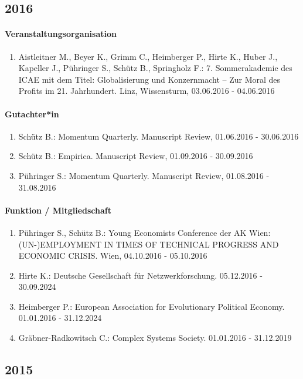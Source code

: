 \subsection*{2016}
\paragraph{Veranstaltungsorganisation}
\begin{enumerate}[leftmargin=*, labelsep=0.5cm]
\item Aistleitner M., Beyer K., Grimm C., Heimberger P., Hirte K., Huber J., Kapeller J., Pühringer S., Schütz B., Springholz F.: 7. Sommerakademie des ICAE mit dem Titel: Globalisierung und Konzernmacht – Zur Moral des Profits im 21. Jahrhundert. Linz, Wissensturm, 03.06.2016 - 04.06.2016
\end{enumerate}

\paragraph{Gutachter*in}
\begin{enumerate}[leftmargin=*, labelsep=0.5cm]
\item Schütz B.: Momentum Quarterly. Manuscript Review, 01.06.2016 - 30.06.2016
\item Schütz B.: Empirica. Manuscript Review, 01.09.2016 - 30.09.2016
\item Pühringer S.: Momentum Quarterly. Manuscript Review, 01.08.2016 - 31.08.2016
\end{enumerate}

\paragraph{Funktion / Mitgliedschaft}
\begin{enumerate}[leftmargin=*, labelsep=0.5cm]
\item Pühringer S., Schütz B.: Young Economists Conference der AK Wien: (UN-)EMPLOYMENT IN TIMES OF TECHNICAL PROGRESS AND ECONOMIC CRISIS. Wien, 04.10.2016 - 05.10.2016
\item Hirte K.: Deutsche Gesellschaft für Netzwerkforschung. 05.12.2016 - 30.09.2024
\item Heimberger P.: European Association for Evolutionary Political Economy. 01.01.2016 - 31.12.2024
\item Gräbner-Radkowitsch C.: Complex Systems Society. 01.01.2016 - 31.12.2019
\end{enumerate}
\subsection*{2015}
